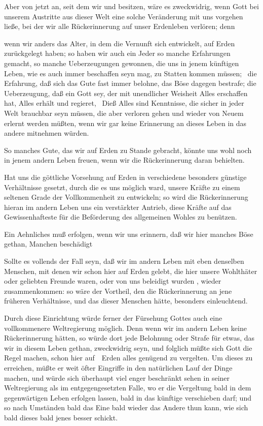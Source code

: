 \begin{aufza}
\item 	Aber von jetzt an, seit dem wir  und  besitzen, wäre es zweckwidrig, wenn Gott bei unserem Austritte aus dieser Welt eine solche Veränderung mit uns vorgehen ließe, bei der wir alle Rückerinnerung auf unser Erdenleben verlören; denn
\begin{aufzb}
\item wenn wir anders das Alter, in dem die Vernunft sich entwickelt, auf Erden zurückgelegt haben; so haben wir auch ein Jeder so manche Erfahrungen gemacht, so manche Ueberzeugungen gewonnen, die uns in jenem künftigen Leben, wie es auch immer beschaffen seyn mag, zu Statten kommen müssen; \zB\ die Erfahrung, daß sich das Gute fast immer belohne, das Böse dagegen bestrafe; die Ueberzeugung, daß ein Gott sey, der mit unendlicher Weisheit Alles erschaffen hat, Alles erhält und regieret, \usw\ Dieß Alles sind Kenntnisse, die sicher in jeder Welt brauchbar seyn müssen, die aber verloren gehen und wieder von Neuem erlernt werden müßten, wenn wir gar keine Erinnerung an dieses Leben in das andere mitnehmen würden.
\item So manches Gute, das wir auf Erden zu Stande gebracht, könnte uns wohl noch in jenem andern Leben freuen, wenn wir die Rückerinnerung daran behielten.
\item Hat uns die göttliche Vorsehung auf Erden in verschiedene besonders günstige Verhältnisse gesetzt, durch die es uns möglich ward, unsere Kräfte zu einem seltenen Grade der Vollkommenheit zu entwickeln; so wird die Rückerinnerung hieran im andern Leben uns ein verstärkter Antrieb, diese Kräfte auf das Gewissenhafteste für die Beförderung des allgemeinen Wohles zu benützen.
\item Ein Aehnliches muß erfolgen, wenn wir uns erinnern, daß wir hier manches Böse gethan, Manchen beschädigt \udgl\
\item Sollte es vollends der Fall seyn, daß wir im andern Leben mit eben denselben Menschen, mit denen wir schon hier auf Erden gelebt, die hier unsere Wohlthäter oder geliebten Freunde waren, oder von uns beleidigt wurden \udgl , wieder zusammenkommen: so wäre der Vortheil, den die Rückerinnerung an jene früheren Verhältnisse, und das  dieser Menschen hätte, besonders einleuchtend.
\item Durch diese Einrichtung würde ferner der Fürsehung Gottes auch eine vollkommenere Weltregierung möglich. Denn wenn wir im andern Leben keine Rückerinnerung hätten, so würde dort jede Belohnung oder Strafe für etwas, das wir in diesem Leben gethan, zweckwidrig seyn, und folglich müßte sich Gott die Regel machen, schon hier auf~\RWSeitenw{224}\ Erden alles genügend zu vergelten. Um dieses zu erreichen, müßte er weit öfter Eingriffe in den natürlichen Lauf der Dinge machen, und würde sich überhaupt viel enger beschränkt sehen in seiner Weltregierung als im entgegengesetzten Falle, wo er die Vergeltung bald in dem gegenwärtigen Leben erfolgen lassen, bald in das künftige verschieben darf; und so nach Umständen bald das Eine bald wieder das Andere thun kann, wie sich bald dieses bald jenes besser schickt.

\end{aufzb}
\end{aufza}
